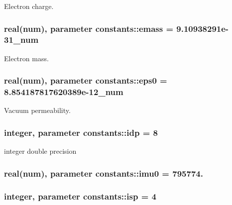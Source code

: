 Electron charge. 

\subsubsection[{\texorpdfstring{emass}{emass}}]{\setlength{\rightskip}{0pt plus 5cm}real({\bf num}), parameter constants\+::emass = 9.\+10938291e-\/31\+\_\+num}\hypertarget{namespaceconstants_ad39536f583f0861abb2fb19a27c56fc8}{}\label{namespaceconstants_ad39536f583f0861abb2fb19a27c56fc8}


Electron mass. 

\subsubsection[{\texorpdfstring{eps0}{eps0}}]{\setlength{\rightskip}{0pt plus 5cm}real({\bf num}), parameter constants\+::eps0 = 8.\+854187817620389e-\/12\+\_\+num}\hypertarget{namespaceconstants_a4fc609b4d7bd5d8e45e57bd0ba7c5e29}{}\label{namespaceconstants_a4fc609b4d7bd5d8e45e57bd0ba7c5e29}


Vacuum permeability. 

\subsubsection[{\texorpdfstring{idp}{idp}}]{\setlength{\rightskip}{0pt plus 5cm}integer, parameter constants\+::idp = 8}\hypertarget{namespaceconstants_ae345db51770e3628e6aaf76e6a45e160}{}\label{namespaceconstants_ae345db51770e3628e6aaf76e6a45e160}


integer double precision 

\subsubsection[{\texorpdfstring{imu0}{imu0}}]{\setlength{\rightskip}{0pt plus 5cm}real({\bf num}), parameter constants\+::imu0 = 795774.}\hypertarget{namespaceconstants_abcf10ccefe6023e0401ce1b4a5f74fb5}{}\label{namespaceconstants_abcf10ccefe6023e0401ce1b4a5f74fb5}
\subsubsection[{\texorpdfstring{isp}{isp}}]{\setlength{\rightskip}{0pt plus 5cm}integer, parameter constants\+::isp = 4}\hypertarget{namespaceconstants_a5a2ae450a00d2a29f9b70dcb776f7a2f}{}\label{namespaceconstants_a5a2ae450a00d2a29f9b70dcb776f7a2f}


